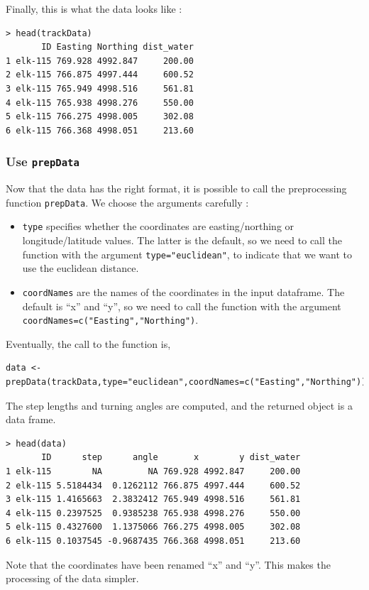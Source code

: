 \documentclass[]{article}
\begin{document}
\noindent Finally, this is what the data looks like :
\begin{lstlisting}
> head(trackData)
       ID Easting Northing dist_water
1 elk-115 769.928 4992.847     200.00
2 elk-115 766.875 4997.444     600.52
3 elk-115 765.949 4998.516     561.81
4 elk-115 765.938 4998.276     550.00
5 elk-115 766.275 4998.005     302.08
6 elk-115 766.368 4998.051     213.60
\end{lstlisting}

\subsubsection{Use \texttt{prepData}}
Now that the data has the right format, it is possible to call the preprocessing function \texttt{prepData}. We choose the arguments carefully :
\begin{itemize}
	\item \texttt{type} specifies whether the coordinates are easting/northing or longitude/latitude values. The latter is the default, so we need to call the function with the argument \texttt{type="euclidean"}, to indicate that we want to use the euclidean distance.
	\item \texttt{coordNames} are the names of the coordinates in the input dataframe. The default is ``x'' and ``y'', so we need to call the function with the argument \texttt{coordNames=c("Easting","Northing")}.
\end{itemize}

\noindent Eventually, the call to the function is,

\begin{lstlisting}
data <- prepData(trackData,type="euclidean",coordNames=c("Easting","Northing"))
\end{lstlisting}

The step lengths and turning angles are computed, and the returned object is a data frame.

\begin{lstlisting}
> head(data)
       ID      step      angle       x        y dist_water
1 elk-115        NA         NA 769.928 4992.847     200.00
2 elk-115 5.5184434  0.1262112 766.875 4997.444     600.52
3 elk-115 1.4165663  2.3832412 765.949 4998.516     561.81
4 elk-115 0.2397525  0.9385238 765.938 4998.276     550.00
5 elk-115 0.4327600  1.1375066 766.275 4998.005     302.08
6 elk-115 0.1037545 -0.9687435 766.368 4998.051     213.60
\end{lstlisting}

Note that the coordinates have been renamed ``x'' and ``y''. This makes the processing of the data simpler.\\
\end{document}
